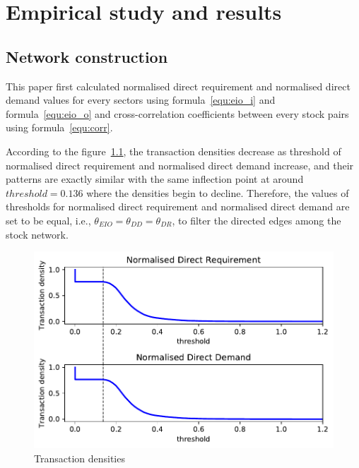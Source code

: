 \chapter{Empirical study and results}
\section{Network construction}
This paper first calculated normalised direct requirement and normalised direct demand values for every sectors using formula~\ref{equ:eio_i} and formula~\ref{equ:eio_o} and cross-correlation coefficients between every stock pairs using formula~\ref{equ:corr}.

According to the figure~\ref{fig:eio_transaction_density}, the transaction densities decrease as threshold of normalised direct requirement and normalised direct demand increase, and their patterns are exactly similar with the same inflection point at around $threshold=0.136$ where the densities begin to decline. Therefore, the values of thresholds for normalised direct requirement and normalised direct demand are set to be equal, i.e., $\theta_{EIO}=\theta_{DD}=\theta_{DR}$,  to filter the directed edges among the stock network.

\begin{figure}
	\begin{center}
		\includegraphics[width=14cm]{eio_transaction_density}
	\end{center}
	\caption{Transaction densities}
	\label{fig:eio_transaction_density}
\end{figure}

